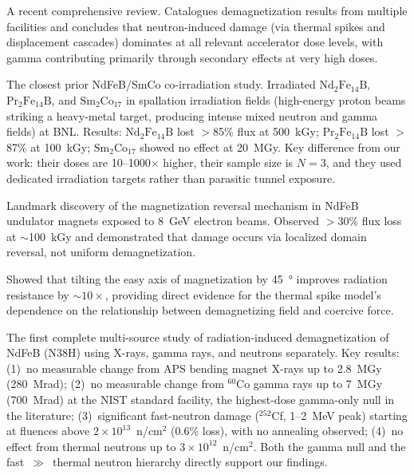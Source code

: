 \documentclass[11pt,letterpaper]{article}
\begin{document}
\begin{description}[style=nextline]
    \item[Samin \cite{Samin2018}]
    A recent comprehensive review. Catalogues demagnetization results from
    multiple facilities and concludes that neutron-induced damage (via thermal
    spikes and displacement cascades) dominates at all relevant accelerator
    dose levels, with gamma contributing primarily through secondary effects at
    very high doses.

    \item[Simos et al.\ \cite{Simos2018}]
    The closest prior NdFeB/SmCo co-irradiation study. Irradiated
    $\mathrm{Nd_2Fe_{14}B}$, $\mathrm{Pr_2Fe_{14}B}$, and
    $\mathrm{Sm_2Co_{17}}$ in spallation irradiation fields (high-energy
    proton beams striking a heavy-metal target, producing intense mixed
    neutron and gamma fields) at BNL. Results:
    $\mathrm{Nd_2Fe_{14}B}$ lost $>$85\% flux at \SI{500}{kGy};
    $\mathrm{Pr_2Fe_{14}B}$ lost $>$87\% at \SI{100}{kGy}; $\mathrm{Sm_2Co_{17}}$
    showed no effect at \SI{20}{MGy}. Key difference from our work: their
    doses are 10--1000$\times$ higher, their sample size is $N = 3$, and they
    used dedicated irradiation targets rather than parasitic tunnel exposure.

    \item[Bizen et al.\ (2016) \cite{Bizen2016}]
    Landmark discovery of the magnetization reversal mechanism in NdFeB
    undulator magnets exposed to \SI{8}{GeV} electron beams. Observed $>$30\%
    flux loss at $\sim$\SI{100}{kGy} and demonstrated that damage occurs via
    localized domain reversal, not uniform demagnetization.

    \item[Bizen et al.\ (2018) \cite{Bizen2018}]
    Showed that tilting the easy axis of magnetization by \SI{45}{\degree}
    improves radiation resistance by $\sim$$10\times$, providing direct
    evidence for the thermal spike model's dependence on the relationship
    between demagnetizing field and coercive force.

    \item[Alderman et al.\ \cite{Alderman}]
    The first complete multi-source study of radiation-induced
    demagnetization of NdFeB (N38H) using X-rays, gamma rays, and
    neutrons separately. Key results: (1)~no measurable change from
    APS bending magnet X-rays up to \SI{2.8}{MGy} (280~Mrad);
    (2)~no measurable change from $^{60}$Co gamma rays up to
    \SI{7}{MGy} (700~Mrad) at the NIST standard facility, the
    highest-dose gamma-only null in the literature; (3)~significant
    fast-neutron damage ($^{252}$Cf, 1--2~MeV peak) starting at
    fluences above $2 \times 10^{13}$~n/cm$^2$ (0.6\% loss),
    with no annealing observed; (4)~no effect from thermal neutrons
    up to $3 \times 10^{12}$~n/cm$^2$.
    Both the gamma null and the fast~$\gg$~thermal neutron
    hierarchy directly support our findings.


\end{description}
\end{document}
